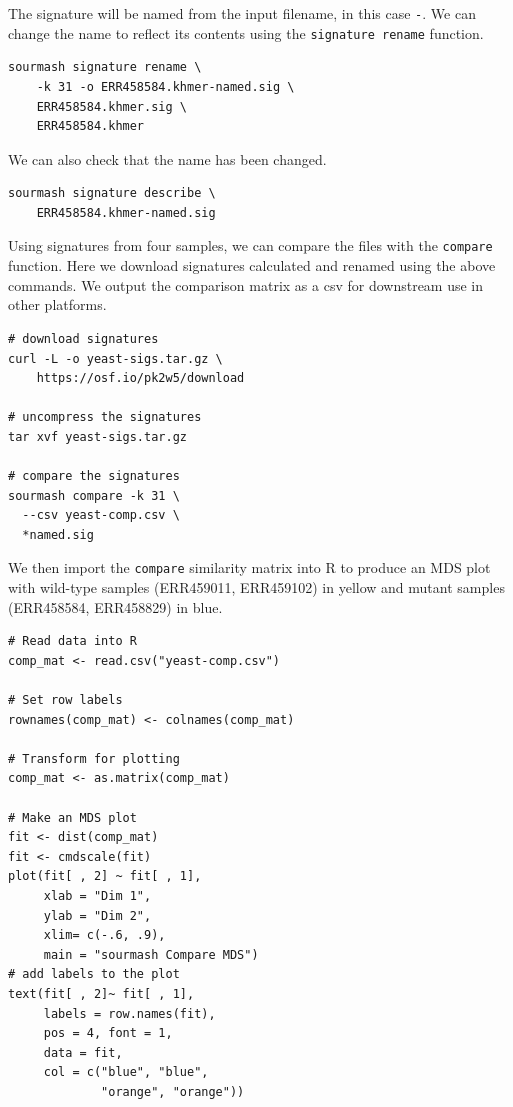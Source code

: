 \documentclass[10pt,a4paper,twocolumn]{article}
\begin{document}
The signature will be named from the input filename, in this case \lstinline{-}. We can change the name to reflect its contents using the \lstinline{signature rename} function. 

\begin{lstlisting}
sourmash signature rename \ 
    -k 31 -o ERR458584.khmer-named.sig \ 
    ERR458584.khmer.sig \ 
    ERR458584.khmer 
\end{lstlisting}

We can also check that the name has been changed. 

\begin{lstlisting}
sourmash signature describe \ 
    ERR458584.khmer-named.sig
\end{lstlisting}

Using signatures from four samples, we can compare the files with the \lstinline{compare} function. Here we download signatures calculated and renamed using the above commands. We output the comparison matrix as a csv for downstream use in other platforms.

\begin{lstlisting}
# download signatures
curl -L -o yeast-sigs.tar.gz \ 
    https://osf.io/pk2w5/download

# uncompress the signatures
tar xvf yeast-sigs.tar.gz

# compare the signatures
sourmash compare -k 31 \ 
  --csv yeast-comp.csv \ 
  *named.sig
\end{lstlisting}

We then import the \lstinline{compare} similarity matrix into R to produce an MDS plot with wild-type samples (ERR459011, ERR459102) in yellow and mutant samples (ERR458584, ERR458829) in blue.

\begin{lstlisting}
# Read data into R
comp_mat <- read.csv("yeast-comp.csv")

# Set row labels
rownames(comp_mat) <- colnames(comp_mat)

# Transform for plotting
comp_mat <- as.matrix(comp_mat)

# Make an MDS plot
fit <- dist(comp_mat)
fit <- cmdscale(fit)
plot(fit[ , 2] ~ fit[ , 1], 
     xlab = "Dim 1", 
     ylab = "Dim 2",
     xlim= c(-.6, .9),
     main = "sourmash Compare MDS")
# add labels to the plot
text(fit[ , 2]~ fit[ , 1], 
     labels = row.names(fit), 
     pos = 4, font = 1,
     data = fit, 
     col = c("blue", "blue", 
             "orange", "orange"))
\end{lstlisting}
\end{document}
